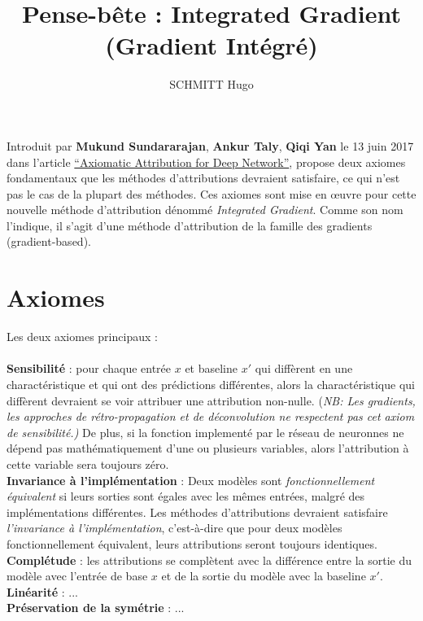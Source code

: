 \documentclass[12pt,a4paper]{article}
\title{\bfseries Pense-bête : Integrated Gradient \\ (Gradient Intégré)}
\author{SCHMITT Hugo}
\begin{document}
\maketitle

Introduit par \textbf{Mukund Sundararajan}, \textbf{Ankur Taly}, \textbf{Qiqi Yan} le 13 juin 2017 dans l'article \href{https://arxiv.org/pdf/1703.01365}{``Axiomatic Attribution for Deep Network''}, propose deux axiomes fondamentaux que les méthodes d'attributions devraient satisfaire, ce qui n'est pas le cas de la plupart des méthodes. Ces axiomes sont mise en œuvre pour cette nouvelle méthode d'attribution dénommé \emph{Integrated Gradient}. Comme son nom l'indique, il s'agit d'une méthode d'attribution de la famille des gradients (gradient-based).

\section*{Axiomes}
Les deux axiomes principaux :\\\\
\textbf{Sensibilité} : pour chaque entrée $x$ et baseline $x'$ qui diffèrent en une charactéristique et qui ont des prédictions différentes, alors la charactéristique qui diffèrent devraient se voir attribuer une attribution non-nulle.
{(\small\textit{NB: Les gradients, les approches de rétro-propagation et de déconvolution ne respectent pas cet axiom de sensibilité.)}} De plus, si la fonction implementé par le réseau de neuronnes ne dépend pas mathématiquement d'une ou plusieurs variables, alors l'attribution à cette variable sera toujours zéro.\\

\textbf{Invariance à l'implémentation} : Deux modèles sont \textit{fonctionnellement équivalent} si leurs sorties sont égales avec les mêmes entrées, malgré des implémentations différentes. Les méthodes d'attributions devraient satisfaire \textit{l'invariance à l'implémentation}, c'est-à-dire que pour deux modèles fonctionnellement équivalent, leurs attributions seront toujours identiques.\\

\textbf{Complétude} : les attributions se complètent avec la différence entre la sortie du modèle avec l'entrée de base $x$ et de la sortie du modèle avec la baseline $x'$.\\

\textbf{Linéarité} : ...\\

\textbf{Préservation de la symétrie} : ...\\
\end{document}
